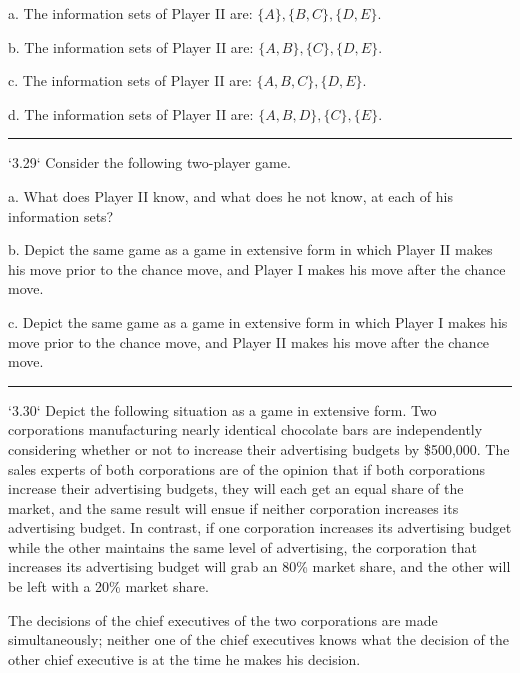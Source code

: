 \documentclass[10pt]{report}
\begin{document}
		a. The information sets of Player II are: $\{A\}, \{B, C\}, \{D, E\}$.

		b. The information sets of Player II are: $\{A, B\}, \{C\}, \{D, E\}$.

		c. The information sets of Player II are: $\{A, B, C\}, \{D, E\}$.

		d. The information sets of Player II are: $\{A, B, D\}, \{C\}, \{E\}$.

\vspace{0.5cm}
\hrule
\vspace{0.5cm}
`3.29` Consider the following two-player game.

a. What does Player II know, and what does he not know, at each of his information sets?

b. Depict the same game as a game in extensive form in which Player II makes his move prior to the chance move, and Player I makes his move after the chance move.

c. Depict the same game as a game in extensive form in which Player I makes his move prior to the chance move, and Player II makes his move after the chance move.

\vspace{0.5cm}
\hrule
\vspace{0.5cm}
`3.30` Depict the following situation as a game in extensive form. Two corporations manufacturing nearly identical chocolate bars are independently considering whether or not to increase their advertising budgets by \$500,000. The sales experts of both corporations are of the opinion that if both corporations increase their advertising budgets, they will each get an equal share of the market, and the same result will ensue if neither corporation increases its advertising budget. In contrast, if one corporation increases its advertising budget while the other maintains the same level of advertising, the corporation that increases its advertising budget will grab an 80\% market share, and the other will be left with a 20\% market share.

The decisions of the chief executives of the two corporations are made simultaneously; neither one of the chief executives knows what the decision of the other chief executive is at the time he makes his decision.
\end{document}
